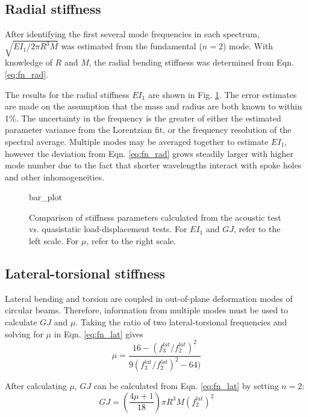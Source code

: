 \documentclass[../thesis.tex]{subfiles}
\begin{document}
\subsection{Radial stiffness}

After identifying the first several mode frequencies in each spectrum, $\sqrt{EI_1/2\pi R^3M}$ was estimated from the fundamental ($n=2$) mode. With knowledge of $R$ and $M$, the radial bending stiffness was determined from Eqn. \eqref{eq:fn_rad}.

The results for the radial stiffness $EI_1$ are shown in Fig. \ref{fig:bar}. The error estimates are made on the assumption that the mass and radius are both known to within 1\%. The uncertainty in the frequency is the greater of either the estimated parameter variance from the Lorentzian fit, or the frequency resolution of the spectral average. Multiple modes may be averaged together to estimate $EI_1$, however the deviation from Eqn. \eqref{eq:fn_rad} grows steadily larger with higher mode number due to the fact that shorter wavelengths interact with spoke holes and other inhomogeneities.

\begin{figure}
{bar_plot}
\caption{Comparison of stiffness parameters calculated from the acoustic test vs. quasistatic load-displacement tests. For $EI_1$ and $GJ$, refer to the left scale. For $\mu$, refer to the right scale.}
\label{fig:bar}
\end{figure}

\subsection{Lateral-torsional stiffness}

Lateral bending and torsion are coupled in out-of-plane deformation modes of circular beams. Therefore, information from multiple modes must be used to calculate $GJ$ and $\mu$. Taking the ratio of two lateral-torsional frequencies and solving for $\mu$ in Eqn. \eqref{eq:fn_lat} gives
  \begin{equation}\label{eq:mu}
  \mu = \frac{16 - (f_3^{lat}/f_2^{lat})^2}{9(f_3^{lat}/f_2^{lat})^2 - 64)}
  \end{equation}

After calculating $\mu$, $GJ$ can be calculated from Eqn. \eqref{eq:fn_lat} by setting $n=2$:
  \begin{equation}\label{eq:GJ}
  GJ = \left(\frac{4\mu + 1}{18} \right ) \pi R^3M(f_2^{lat})^2
  \end{equation}
\end{document}
